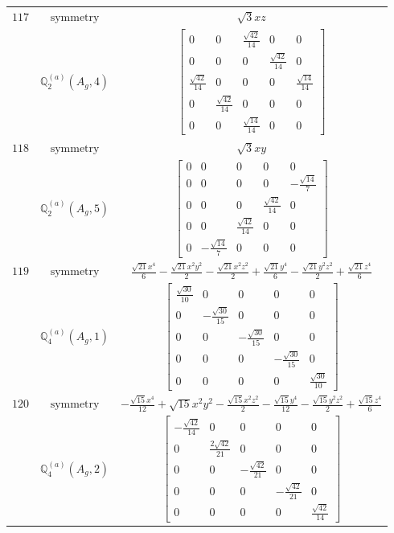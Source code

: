 \documentclass[fleqn,8pt,landscape]{jsarticle}
\begin{document}
\begin{longtable}{ccc}
$ 117 $ & $ \text{symmetry} $ & $ \sqrt{3} x z $ \\
$  $ & $ \mathbb{Q}_{2}^{(a)}(A_{g},4) $ & $ \begin{bmatrix} 0 & 0 & \frac{\sqrt{42}}{14} & 0 & 0 \\ 0 & 0 & 0 & \frac{\sqrt{42}}{14} & 0 \\ \frac{\sqrt{42}}{14} & 0 & 0 & 0 & \frac{\sqrt{14}}{14} \\ 0 & \frac{\sqrt{42}}{14} & 0 & 0 & 0 \\ 0 & 0 & \frac{\sqrt{14}}{14} & 0 & 0 \end{bmatrix} $ \\ \hline
$ 118 $ & $ \text{symmetry} $ & $ \sqrt{3} x y $ \\
$  $ & $ \mathbb{Q}_{2}^{(a)}(A_{g},5) $ & $ \begin{bmatrix} 0 & 0 & 0 & 0 & 0 \\ 0 & 0 & 0 & 0 & - \frac{\sqrt{14}}{7} \\ 0 & 0 & 0 & \frac{\sqrt{42}}{14} & 0 \\ 0 & 0 & \frac{\sqrt{42}}{14} & 0 & 0 \\ 0 & - \frac{\sqrt{14}}{7} & 0 & 0 & 0 \end{bmatrix} $ \\ \hline
$ 119 $ & $ \text{symmetry} $ & $ \frac{\sqrt{21} x^{4}}{6} - \frac{\sqrt{21} x^{2} y^{2}}{2} - \frac{\sqrt{21} x^{2} z^{2}}{2} + \frac{\sqrt{21} y^{4}}{6} - \frac{\sqrt{21} y^{2} z^{2}}{2} + \frac{\sqrt{21} z^{4}}{6} $ \\
$  $ & $ \mathbb{Q}_{4}^{(a)}(A_{g},1) $ & $ \begin{bmatrix} \frac{\sqrt{30}}{10} & 0 & 0 & 0 & 0 \\ 0 & - \frac{\sqrt{30}}{15} & 0 & 0 & 0 \\ 0 & 0 & - \frac{\sqrt{30}}{15} & 0 & 0 \\ 0 & 0 & 0 & - \frac{\sqrt{30}}{15} & 0 \\ 0 & 0 & 0 & 0 & \frac{\sqrt{30}}{10} \end{bmatrix} $ \\ \hline
$ 120 $ & $ \text{symmetry} $ & $ - \frac{\sqrt{15} x^{4}}{12} + \sqrt{15} x^{2} y^{2} - \frac{\sqrt{15} x^{2} z^{2}}{2} - \frac{\sqrt{15} y^{4}}{12} - \frac{\sqrt{15} y^{2} z^{2}}{2} + \frac{\sqrt{15} z^{4}}{6} $ \\
$  $ & $ \mathbb{Q}_{4}^{(a)}(A_{g},2) $ & $ \begin{bmatrix} - \frac{\sqrt{42}}{14} & 0 & 0 & 0 & 0 \\ 0 & \frac{2 \sqrt{42}}{21} & 0 & 0 & 0 \\ 0 & 0 & - \frac{\sqrt{42}}{21} & 0 & 0 \\ 0 & 0 & 0 & - \frac{\sqrt{42}}{21} & 0 \\ 0 & 0 & 0 & 0 & \frac{\sqrt{42}}{14} \end{bmatrix} $ \\ \hline

\end{longtable}
\end{document}
